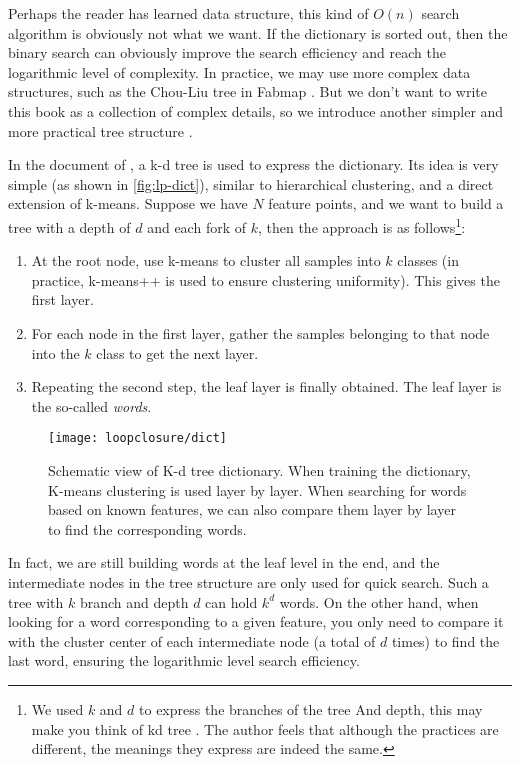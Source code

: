 Perhaps the reader has learned data structure, this kind of $O(n)$ search algorithm is obviously not what we want. If the dictionary is sorted out, then the binary search can obviously improve the search efficiency and reach the logarithmic level of complexity. In practice, we may use more complex data structures, such as the Chou-Liu tree {\cite{Chow1968}} in Fabmap {\cite{Cummins2008, Cummins2010, Cummins2011}}. But we don't want to write this book as a collection of complex details, so we introduce another simpler and more practical tree structure {\cite{Galvez-Lopez2012}}.

In the document of \cite{Galvez-Lopez2012}, a k-d tree is used to express the dictionary. Its idea is very simple (as shown in \autoref{fig:lp-dict}), similar to hierarchical clustering, and a direct extension of k-means. Suppose we have $N$ feature points, and we want to build a tree with a depth of $d$ and each fork of $k$, then the approach is as follows\footnote{We used $k$ and $d$ to express the branches of the tree And depth, this may make you think of kd tree \textsuperscript{\cite{Bentley1975}}. The author feels that although the practices are different, the meanings they express are indeed the same. }:

\begin{mdframed}
	\begin{enumerate}
		\item At the root node, use k-means to cluster all samples into $k$ classes (in practice, k-means++ is used to ensure clustering uniformity). This gives the first layer.
		\item For each node in the first layer, gather the samples belonging to that node into the $k$ class to get the next layer.
		\item Repeating the second step, the leaf layer is finally obtained. The leaf layer is the so-called \textit{words}.
	\end{enumerate}
\end{mdframed}

\begin{figure}[!ht]
	\centering
	\texttt{[image: loopclosure/dict]}
	\caption{Schematic view of K-d tree dictionary. When training the dictionary, K-means clustering is used layer by layer. When searching for words based on known features, we can also compare them layer by layer to find the corresponding words.}
	\label{fig:lp-dict}
\end{figure}

In fact, we are still building words at the leaf level in the end, and the intermediate nodes in the tree structure are only used for quick search. Such a tree with $k$ branch and depth $d$ can hold $k^d$ words. On the other hand, when looking for a word corresponding to a given feature, you only need to compare it with the cluster center of each intermediate node (a total of $d$ times) to find the last word, ensuring the logarithmic level search efficiency.

